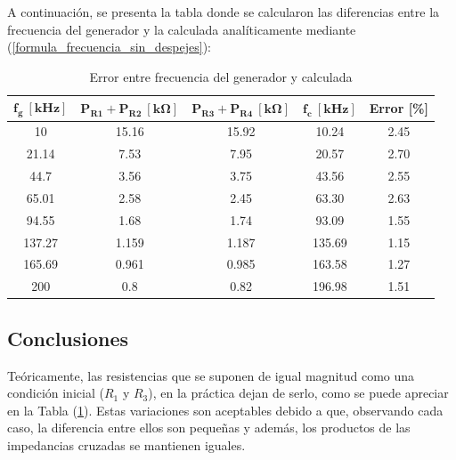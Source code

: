 A continuación, se presenta la tabla donde se calcularon las diferencias entre la frecuencia del generador y la calculada analíticamente mediante (\ref{formula_frecuencia_sin_despejes}):
\begin{table}[H]
\centering
\begin{tabular}{ccccc}
\hline
$\mathbf{f_g \ [kHz]}$ & $\mathbf{P_{R1} + P_{R2} \ [k\Omega]}$ & $\mathbf{P_{R3} + P_{R4} \ [k\Omega]}$ & $\mathbf{f_c \ [kHz]}$ & \textbf{Error [\%]} \\
\hline
10                     & 15.16                                  & 15.92                                  & 10.24                  & 2.45                \\
21.14                  & 7.53                                   & 7.95                                   & 20.57                  & 2.70                \\
44.7                   & 3.56                                   & 3.75                                   & 43.56                  & 2.55                \\
65.01                  & 2.58                                   & 2.45                                   & 63.30                  & 2.63                \\
94.55                  & 1.68                                   & 1.74                                   & 93.09                  & 1.55                \\
137.27                 & 1.159                                  & 1.187                                  & 135.69                 & 1.15                \\
165.69                 & 0.961                                  & 0.985                                  & 163.58                 & 1.27                \\
200                    & 0.8                                    & 0.82                                   & 196.98                 & 1.51   				\\
\hline            
\end{tabular}
\caption{Error entre frecuencia del generador y calculada}
\label{tab:Tabla_error}
\end{table}

\subsection{Conclusiones}

Teóricamente, las resistencias que se suponen de igual magnitud como una condición inicial ($R_1$ y $R_3$), en la práctica dejan de serlo, como se puede apreciar en la Tabla (\ref{tab:Tabla_error}). Estas variaciones son aceptables debido a que, observando cada caso, la diferencia entre ellos son pequeñas y además, los productos de las impedancias cruzadas se mantienen iguales.

